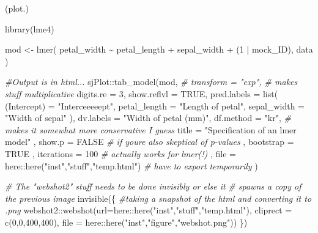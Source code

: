 \documentclass[]{elsarticle} %
\newenvironment{Shaded}{\begin{snugshade}}{\end{snugshade}}
\newcommand{\AttributeTok}[1]{\textcolor[rgb]{0.77,0.63,0.00}{#1}}
\newcommand{\CommentTok}[1]{\textcolor[rgb]{0.56,0.35,0.01}{\textit{#1}}}
\newcommand{\ConstantTok}[1]{\textcolor[rgb]{0.00,0.00,0.00}{#1}}
\newcommand{\DecValTok}[1]{\textcolor[rgb]{0.00,0.00,0.81}{#1}}
\newcommand{\FunctionTok}[1]{\textcolor[rgb]{0.00,0.00,0.00}{#1}}
\newcommand{\NormalTok}[1]{#1}
\newcommand{\OtherTok}[1]{\textcolor[rgb]{0.56,0.35,0.01}{#1}}
\newcommand{\SpecialCharTok}[1]{\textcolor[rgb]{0.00,0.00,0.00}{#1}}
\newcommand{\StringTok}[1]{\textcolor[rgb]{0.31,0.60,0.02}{#1}}
\begin{document}
\begin{Shaded}
\begin{Highlighting}[]
\NormalTok{(plot.)}


\FunctionTok{library}\NormalTok{(lme4)}

\NormalTok{mod }\OtherTok{\textless{}{-}} \FunctionTok{lmer}\NormalTok{(}
\NormalTok{  petal\_width }\SpecialCharTok{\textasciitilde{}}
\NormalTok{    petal\_length }\SpecialCharTok{+}
\NormalTok{    sepal\_width }\SpecialCharTok{+}
\NormalTok{    (}\DecValTok{1} \SpecialCharTok{|}\NormalTok{ mock\_ID),}
\NormalTok{  data}
\NormalTok{)}


\CommentTok{\#Output is in html...}
\NormalTok{sjPlot}\SpecialCharTok{::}\FunctionTok{tab\_model}\NormalTok{(mod,}
    \CommentTok{\# transform = "exp", \# makes stuff multiplicative}
    \AttributeTok{digits.re =} \DecValTok{3}\NormalTok{,}
    \AttributeTok{show.reflvl =} \ConstantTok{TRUE}\NormalTok{,}
    \AttributeTok{pred.labels =} \FunctionTok{list}\NormalTok{(}
      \StringTok{\textasciigrave{}}\AttributeTok{(Intercept)}\StringTok{\textasciigrave{}} \OtherTok{=} \StringTok{"Interceeeeept"}\NormalTok{,}
      \AttributeTok{petal\_length  =} \StringTok{"Length of petal"}\NormalTok{,}
      \AttributeTok{sepal\_width   =} \StringTok{"Width of sepal"}
\NormalTok{    ),}
    \AttributeTok{dv.labels =} \StringTok{"Width of petal (mm)"}\NormalTok{,}
    \AttributeTok{df.method =} \StringTok{"kr"}\NormalTok{, }\CommentTok{\# makes it somewhat more conservative I guess}
    \AttributeTok{title =} \StringTok{"Specification of an lmer model"}
\NormalTok{    , }\AttributeTok{show.p =} \ConstantTok{FALSE} \CommentTok{\# if you\textquotesingle{}re also skeptical of p{-}values}
\NormalTok{    , }\AttributeTok{bootstrap =} \ConstantTok{TRUE}
\NormalTok{    , }\AttributeTok{iterations =} \DecValTok{100} \CommentTok{\# actually works for lmer(!)}
\NormalTok{    , }\AttributeTok{file =}\NormalTok{ here}\SpecialCharTok{::}\FunctionTok{here}\NormalTok{(}\StringTok{"inst"}\NormalTok{,}\StringTok{"stuff"}\NormalTok{,}\StringTok{"temp.html"}\NormalTok{) }\CommentTok{\# have to export temporarily}
\NormalTok{  )}


  \CommentTok{\# The "webshot2" stuff needs to be done \textquotesingle{}invisibly\textquotesingle{} or else it }
  \CommentTok{\# spawns a copy of the previous image  }
\FunctionTok{invisible}\NormalTok{(\{}
  \CommentTok{\#taking a \textquotesingle{}snapshot\textquotesingle{} of the html and converting it to .png}
\NormalTok{  webshot2}\SpecialCharTok{::}\FunctionTok{webshot}\NormalTok{(}\AttributeTok{url=}\NormalTok{here}\SpecialCharTok{::}\FunctionTok{here}\NormalTok{(}\StringTok{"inst"}\NormalTok{,}\StringTok{"stuff"}\NormalTok{,}\StringTok{"temp.html"}\NormalTok{), }
                    \AttributeTok{cliprect =} \FunctionTok{c}\NormalTok{(}\DecValTok{0}\NormalTok{,}\DecValTok{0}\NormalTok{,}\DecValTok{400}\NormalTok{,}\DecValTok{400}\NormalTok{),}
                    \AttributeTok{file =}\NormalTok{ here}\SpecialCharTok{::}\FunctionTok{here}\NormalTok{(}\StringTok{"inst"}\NormalTok{,}\StringTok{"figure"}\NormalTok{,}\StringTok{"webshot.png"}\NormalTok{))}
\NormalTok{\})}




\end{Highlighting}
\end{Shaded}
\end{document}
